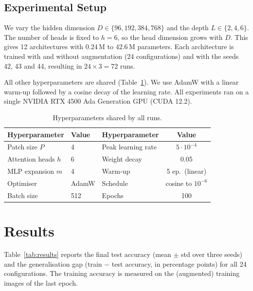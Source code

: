 \subsection{Experimental Setup}

We vary the hidden dimension $D\in\{96,192,384,768\}$ and the depth $L\in\{2,4,6\}$. The number of heads is fixed to $h=6$, so the head dimension grows with $D$. This gives 12 architectures with $0.24$\,M to $42.6$\,M parameters. Each architecture is trained with and without augmentation (24 configurations) and with the seeds 42, 43 and 44, resulting in $24\times3=72$ runs.

All other hyperparameters are shared (Table~\ref{tab:hparams}). We use AdamW with a linear warm-up followed by a cosine decay of the learning rate. All experiments ran on a single NVIDIA RTX 4500 Ada Generation GPU (CUDA 12.2).

\begin{table}[H]
\centering\small
\caption{Hyperparameters shared by all runs.}
\label{tab:hparams}
\begin{tabular}{lllc}
\toprule
Hyperparameter & Value & Hyperparameter & Value \\
\midrule
Patch size $P$ & 4 & Peak learning rate & $5\cdot10^{-4}$ \\
Attention heads $h$ & 6 & Weight decay & 0.05 \\
MLP expansion $m$ & 4 & Warm-up & 5 ep.\ (linear) \\
Optimiser & AdamW & Schedule & cosine to $10^{-6}$ \\
Batch size & 512 & Epochs & 100 \\
\bottomrule
\end{tabular}
\end{table}

\section{Results}
\label{result}

Table~\ref{tab:results} reports the final test accuracy (mean $\pm$ std over three seeds) and the generalisation gap (train $-$ test accuracy, in percentage points) for all 24 configurations. The training accuracy is measured on the (augmented) training images of the last epoch.

